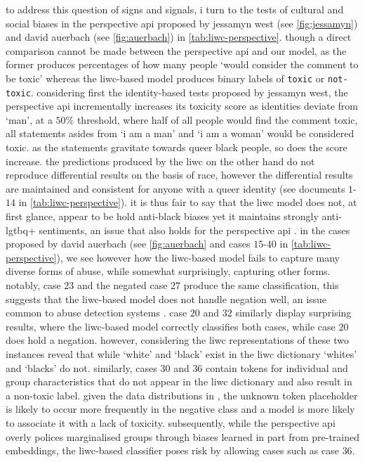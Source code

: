 to address this question of signs and signals, i turn to the tests of cultural and social biases in the perspective api proposed by jessamyn west (see \autoref{fig:jessamyn}) and david auerbach (see \autoref{fig:auerbach}) in \autoref{tab:liwc-perspective}.
though a direct comparison cannot be made between the perspective api and our model, as the former produces percentages of how many people `would consider the comment to be toxic' \citep{perspective:github} whereas the liwc-based model produces binary labels of \texttt{toxic} or \texttt{not-toxic}.
considering first the identity-based tests proposed by jessamyn west, the perspective api incrementally increases its toxicity score as identities deviate from `man', at a $50\%$ threshold, where half of all people would find the comment toxic, all statements asides from `i am a man' and `i am a woman' would be considered toxic.
as the statements gravitate towards queer black people, so does the score increase.
the predictions produced by the liwc on the other hand do not reproduce differential results on the basis of race, however the differential results are maintained and consistent for anyone with a queer identity (see documents $1$-$14$ in \autoref{tab:liwc-perspective}).
it is thus fair to say that the liwc model does not, at first glance, appear to be hold anti-black biases yet it maintains strongly anti-lgtbq+ sentiments, an issue that also holds for the perspective api \citep{dias:2021}.
in the cases proposed by david auerbach (see \autoref{fig:auerbach} and cases $15$-$40$ in \autoref{tab:liwc-perspective}), we see however how the liwc-based model fails to capture many diverse forms of abuse, while somewhat surprisingly, capturing other forms.
notably, case $23$ and the negated case $27$ produce the same classification, this suggests that the liwc-based model does not handle negation well, an issue common to abuse detection systems \cite{rottger:2021}.
case $20$ and $32$ similarly display surprising results, where the liwc-based model correctly classifies both cases, while case $20$ does hold a negation.
however, considering the liwc representations of these two instances reveal that while `white' and `black' exist in the liwc dictionary `whites' and `blacks' do not.
similarly, cases $30$ and $36$ contain tokens for individual and group characteristics that do not appear in the liwc dictionary and also result in a non-toxic label.
given the data distributions in \citet{wulczyn:2017}, the unknown token placeholder is likely to occur more frequently in the negative class and a model is more likely to associate it with a lack of toxicity.
subsequently, while the perspective api overly polices marginalised groups through biases learned in part from pre-trained embeddings, the liwc-based classifier poses risk by allowing cases such as case $36$.

